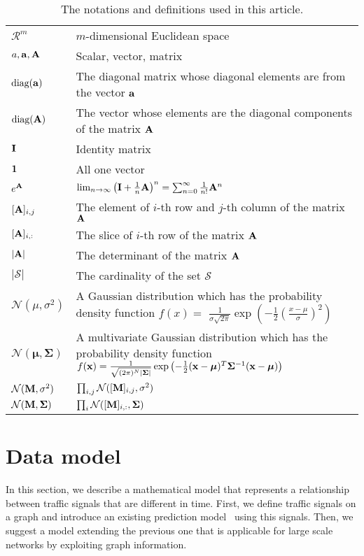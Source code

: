 \documentclass[journal]{IEEEtran}
\begin{document}
\begin{table}[t!]
\caption{The notations and definitions used in this article.}\label{table:definitions}
\renewcommand{\arraystretch}{1.3}
\begin{tabular}{p{1.5cm} p{6.5cm} }
\toprule
$\mathcal{R}^m$ & $m$-dimensional Euclidean space\\ 
$a,{\bf{a}}, {\bf{A}}$ & Scalar, vector, matrix\\
$\text{diag}({\bf{a}})$ & The diagonal matrix whose diagonal elements are from the vector ${\bf{a}}$\\
$\text{diag}({\bf{A}})$ & The vector whose elements are the diagonal components of the matrix ${\bf{A}}$\\
${\bf{I}}$ & Identity matrix\\
${\bf{1}}$ & All one vector\\
$e^{{\bf{A}}}$ & $\lim_{n\rightarrow\infty}\left({\bf{I}}+\frac{1}{n}{\bf{A}}\right)^n=\sum_{n=0}^\infty \frac{1}{n!}{\bf{A}}^n$\\
$[{\bf{A}}]_{i,j}$ & The element of $i$-th row and $j$-th column of the matrix ${\bf{A}}$\\
$[{\bf{A}}]_{i,:}$ & The slice of $i$-th row of the matrix ${\bf{A}}$ \\
$|{\bf{A}}|$ & The determinant of the matrix ${\bf{A}}$\\
$|\mathcal{S}|$ & The cardinality of the set $\mathcal{S}$\\
$\mathcal{N}(\mu,\sigma^2)$ & A Gaussian distribution which has the probability density function $f(x)=$ $\frac{1}{\sigma\sqrt{2\pi}}\exp\left({-\frac{1}{2}\left(\frac{x-\mu}{\sigma}\right)^2}\right)$\\
$\mathcal{N}({\boldsymbol{\mu}},{\boldsymbol{\Sigma}})$ & A multivariate Gaussian distribution which has the probability density function $f({\bf{x}})=\frac{1}{\sqrt{(2\pi)^N|{\boldsymbol{\Sigma}}|}}\exp\left({-\frac{1}{2}({\bf{x}}-{\boldsymbol{\mu}})^T{\boldsymbol{\Sigma}}^{-1}({\bf{x}}-{\boldsymbol{\mu}})}\right)$\\
$\mathcal{N}({\bf{M}},\sigma^2)$ & $\prod_{i,j}\mathcal{N}([{\bf{M}}]_{i,j},\sigma^2)$\\
$\mathcal{N}({\bf{M}},{\boldsymbol{\Sigma}})$ & $\prod_i \mathcal{N}([{\bf{M}}]_{i,:},{\boldsymbol{\Sigma}})$\\
\bottomrule
\end{tabular}
\end{table}


\section{Data model}
In this section, we describe a mathematical model that represents a relationship between traffic signals that are different in time. 
First, we define traffic signals on a graph and introduce an existing prediction model~\cite{kwak2020travel} using this signals. 
Then, we suggest a model extending the previous one that is applicable for large scale networks by exploiting graph information.
\end{document}
